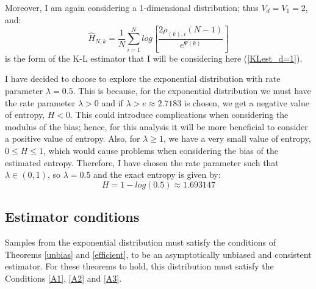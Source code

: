 \documentclass[12pt]{report}
\begin{document}
Moreover, I am again considering a 1-dimensional distribution; thus $V_{d} = V_{1} = 2$, and:
\begin{equation}
\hat{H}_{N, k} =  \frac{1}{N} \sum_{i=1}^{N} log \left[ \frac{2\rho_{(k),i}(N-1)}{e^{\Psi(k)}} \right]\nonumber
\end{equation}
is the form of the K-L estimator that I will be considering here (\ref{KLest_d=1}).

I have decided to choose to explore the exponential distribution with rate parameter $\lambda = 0.5$. This is because, for the exponential distribution we must have the rate parameter $\lambda >0$ and if $\lambda > e \approx 2.7183$ is chosen, we get a negative value of entropy, $H < 0$. This could introduce complications when considering the modulus of the bias; hence, for this analysis it will be more beneficial to consider a positive value of entropy. Also, for $\lambda \geq 1$, we have a very small value of entropy, $0 \leq H \leq 1$, which would cause problems when considering the bias of the estimated entropy. Therefore, I have chosen the rate parameter such that $\lambda \in (0, 1)$, so $\lambda=0.5$ and the exact entropy is given by:
\begin{equation} \label{exponential_exact}
H = 1 - log(0.5) \approx 1.693147
\end{equation}



\subsection{Estimator conditions} \label{E_Conditions}

Samples from the exponential distribution must satisfy the conditions of Theorems \ref{unbias} and \ref{efficient}, to  be an asymptotically unbiased and consistent estimator. For these theorems to hold, this distribution must satisfy the Conditions \ref{A1}, \ref{A2} and \ref{A3}. 
\end{document}
